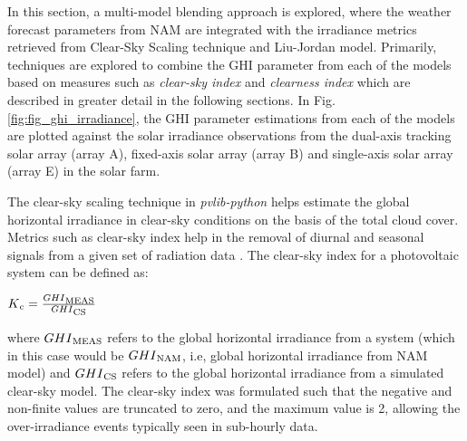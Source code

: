 \par In this section, a multi-model blending approach is explored, where the weather forecast parameters from NAM are integrated with the irradiance metrics retrieved from Clear-Sky Scaling technique and Liu-Jordan model. Primarily, techniques are explored to combine the GHI parameter from each of the models based on measures such as \textit{clear-sky index} and \textit{clearness index} which are described in greater detail in the following sections. In Fig. \ref{fig:fig_ghi_irradiance}, the GHI parameter estimations from each of the models are plotted against the solar irradiance observations from the dual-axis tracking solar array (array A), fixed-axis solar array (array B) and single-axis solar array (array E) in the solar farm. 

The clear-sky scaling technique in \textit{pvlib-python} helps estimate the global horizontal irradiance in clear-sky conditions on the basis of the total cloud cover. Metrics such as clear-sky index help in the removal of diurnal and seasonal signals from a given set of radiation data \cite{expt_clearsky_index}. The clear-sky index for a photovoltaic system can be defined as:\\
\begin{center}
    $K\textsubscript{c} = \frac{GHI\textsubscript{MEAS}}{GHI\textsubscript{CS}}$
\end{center}
where $GHI\textsubscript{MEAS}$ refers to the global horizontal irradiance from a system (which in this case would be $GHI\textsubscript{NAM}$, i.e, global horizontal irradiance from NAM model) and $GHI\textsubscript{CS}$ refers to the global horizontal irradiance from a simulated clear-sky model. The clear-sky index was formulated such that the negative and non-finite values are truncated to zero, and the maximum value is 2, allowing the over-irradiance events typically seen in sub-hourly data.

